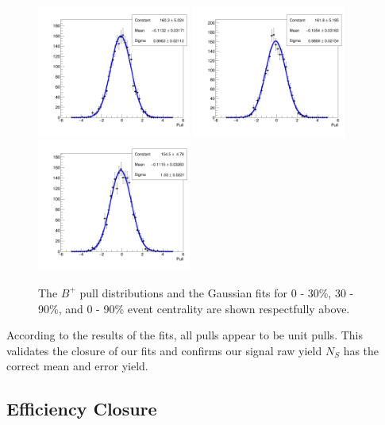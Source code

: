 \begin{figure}[h]
\begin{center}
\includegraphics[width= 0.45\textwidth]{Figures/Chapter5/BP_pull_signal_full_-1_0_90.png}
\includegraphics[width= 0.45\textwidth]{Figures/Chapter5/BP_pull_signal_full_-1_0_30.png}
\includegraphics[width= 0.45\textwidth]{Figures/Chapter5/BP_pull_signal_full_-1_30_90.png}
\caption{The $B^+$ pull distributions and the Gaussian fits for 0 - 30\%, 30 - 90\%, and 0 - 90\% event centrality are shown respectfully above.} 
\label{BPCentPull} 
\end{center}
\end{figure}




According to the results of the fits, all pulls appear to be unit pulls. This validates the closure of our fits and confirms our signal raw yield $N_S$ has the correct mean and error yield.  

\subsection{Efficiency Closure}


